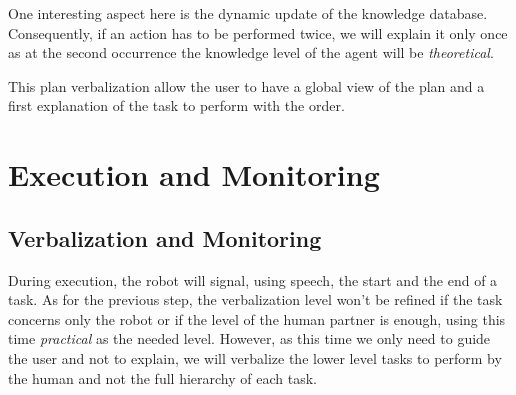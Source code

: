 \documentclass{llncs}
\begin{document}
One interesting aspect here is the dynamic update of the knowledge database.
Consequently, if an action has to be performed twice, we will explain it only once as at the second occurrence the knowledge level of the agent will be \textit{theoretical}.




This plan verbalization allow the user to have a global view of the plan and a first explanation of the task to perform with the order.






%

\section{Execution and Monitoring}
\label{execution}


\subsection{Verbalization and Monitoring}
During execution, the robot will signal, using speech, the start and the end of a task. As for the previous step, the verbalization level won't be refined if the task concerns only the robot or if the level of the human partner is enough, using this time \textit{practical} as the needed level. However, as this time we only need to guide the user and not to explain, we will verbalize the lower level tasks to perform by the human and not the full hierarchy of each task.
\end{document}
